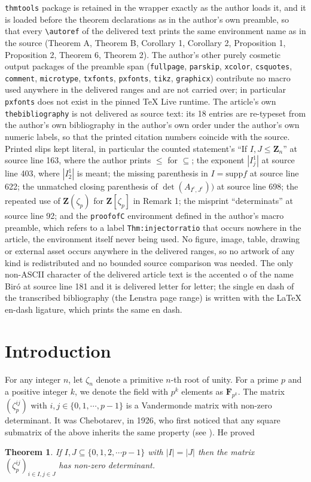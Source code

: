 \documentclass[10pt,a4paper]{amsart}
\newtheorem{theorem}{Theorem}
\def\Z{\mathbf{Z}}
\def\F{\mathbf{F}}
\def\supp{\mathrm{supp}}
\begin{document}
\texttt{thmtools} package is retained in the wrapper exactly as the author loads it, and it is loaded before the theorem declarations as in the author's own preamble, so that every \texttt{\textbackslash autoref} of the delivered text prints the same environment name as in the source (Theorem A, Theorem B, Corollary 1, Corollary 2, Proposition 1, Proposition 2, Theorem 6, Theorem 2). The author's other purely cosmetic output packages of the preamble span (\texttt{fullpage}, \texttt{parskip}, \texttt{xcolor}, \texttt{csquotes}, \texttt{comment}, \texttt{microtype}, \texttt{txfonts}, \texttt{pxfonts}, \texttt{tikz}, \texttt{graphicx}) contribute no macro used anywhere in the delivered ranges and are not carried over; in particular \texttt{pxfonts} does not exist in the pinned TeX Live runtime. The article's own \texttt{thebibliography} is not delivered as source text: its 18 entries are re-typeset from the author's own bibliography in the author's own order under the author's own numeric labels, so that the printed citation numbers coincide with the source. Printed slips kept literal, in particular the counted statement's ``If $I, J \leq \Z_{n}$'' at source line 163, where the author prints $\leq$ for $\subseteq$; the exponent $|I_j^1|$ at source line 403, where $|I_2^1|$ is meant; the missing parenthesis in $I = \supp{f}$ at source line 622; the unmatched closing parenthesis of $\det(A_{I^c,J^c}))$ at source line 698; the repeated use of $\Z(\zeta_p)$ for $\Z[\zeta_p]$ in Remark 1; the misprint ``determinats'' at source line 92; and the \texttt{proofofC} environment defined in the author's macro preamble, which refers to a label \texttt{Thm:injectorratio} that occurs nowhere in the article, the environment itself never being used. No figure, image, table, drawing or external asset occurs anywhere in the delivered ranges, so no artwork of any kind is redistributed and no bounded source comparison was needed. The only non-ASCII character of the delivered article text is the accented o of the name Bir\'o at source line 181 and it is delivered letter for letter; the single en dash of the transcribed bibliography (the Lenstra page range) is written with the LaTeX en-dash ligature, which prints the same en dash.
\section{Introduction}
For any integer $ n$, let $ \zeta_n$  denote a primitive $n$-th root of unity. For a prime $p$  and a positive integer $k$, we denote the field with $ p^k $ elements as $\F_{p^k}$.  The matrix $(\zeta_p^{ij})$ with $i,j \in \{ 0, 1, \cdots, p-1\}$ is a Vandermonde matrix with non-zero determinant. It was Chebotarev, in 1926, who first noticed that any square submatrix of the above inherits the same property (see \cite{Lenstra}). He proved 
\begin{theorem}\label{Thm:Chebotarev}
If $I, J \subseteq \{ 0, 1, 2, \cdots p-1 \}$  with $|I|=|J|$ then the matrix 
$(\zeta_p^{ij})_{i\in I, j \in J}$ has non-zero determinant.
\end{theorem}
\end{document}
